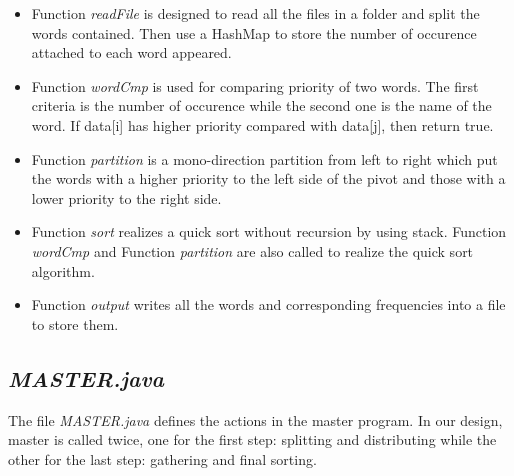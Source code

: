 \documentclass[a4paper,14pt,UTF8]{article}
\begin{document}
	\begin{itemize}
	\item 
	Function \textit{readFile} is designed to read all the files in a folder and split the words contained. Then use a HashMap to store the number of occurence attached to each word appeared.\\
	
	\item
	Function \textit{wordCmp} is used for comparing priority of two words. The first criteria is the number of occurence while the second one is the name of the word. If data[i] has higher priority compared with data[j], then return true.\\
	
	\item
	Function \textit{partition} is a mono-direction partition from left to right which put the words with a higher priority to the left side of the pivot and those with a lower priority to the right side.\\
	
	\item
	Function \textit{sort} realizes a quick sort without recursion by using stack. Function \textit{wordCmp} and Function \textit{partition} are also called to realize the quick sort algorithm.\\

	\item
	Function \textit{output} writes all the words and corresponding frequencies into a file to store them. \\	
	\end{itemize}
	
		  
	\subsection{\textit{MASTER.java}}
	\quad The file \textit{MASTER.java} defines the actions in the master program. In our design, master is called twice, one for the first step: splitting and distributing while the other for the last step: gathering and final sorting. \par 
\end{document}

